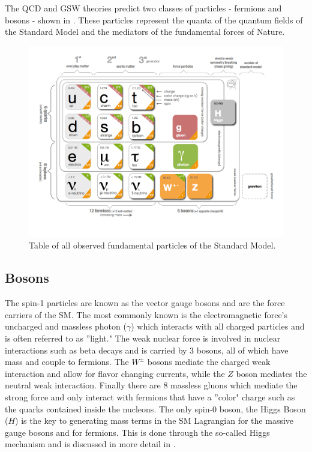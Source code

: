 The QCD and GSW theories predict two classes of particles - fermions and bosons -
shown in . These particles represent the quanta
of the quantum fields of the Standard Model and the mediators of the fundamental
forces of Nature.

\begin{figure}[!htbp]
  \begin{center}
    \includegraphics[width=\linewidth]{figures/theory/standard_model.png}
    \caption{ Table of all observed fundamental particles of the Standard
Model. \cite{Purcell:1473657}}
    \label{fig:standard_model}
  \end{center}
\end{figure}

\subsection{Bosons} \label{sec:theory:bosons}

The spin-1 particles are known as the vector gauge bosons and are the force
carriers of the SM.  The most commonly known is the electromagnetic force's
uncharged and massless photon ($\gamma$) which interacts with all charged
particles and is often referred to as ''light."  The weak nuclear force is
involved in nuclear interactions such as beta decays and is carried by 3
bosons, all of which have mass and couple to fermions.  The $W^{\pm}$ bosons
mediate the charged weak interaction and allow for flavor changing currents,
while the $Z$ boson mediates the neutral weak interaction.  Finally there are 8
massless gluons which mediate the strong force and only interact with fermions
that have a ''color" charge such as the quarks contained inside the nucleons. The
only spin-0 boson, the Higgs Boson ($H$) is the key to generating mass terms in
the SM Lagrangian for the massive gauge bosons and for fermions.  This is done
through the so-called Higgs mechanism \cite{Thomson:2013zua} and is discussed
in more detail in .

